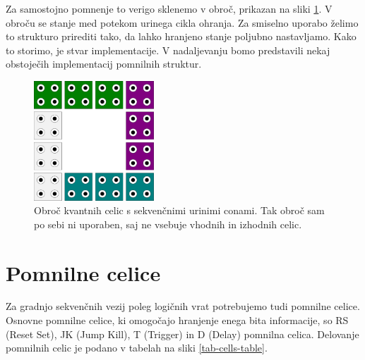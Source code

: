 \documentclass[a4paper, 11pt]{article}
\begin{document}
Za samostojno pomnenje to verigo sklenemo v obroč, prikazan na sliki \ref{img-pregled-seq-circ}.
V obroču se stanje med potekom urinega cikla ohranja.
Za smiselno uporabo želimo to strukturo prirediti tako, da lahko hranjeno stanje poljubno nastavljamo.
Kako to storimo, je stvar implementacije.
V nadaljevanju bomo predstavili nekaj obstoječih implementacij pomnilnih struktur.

\begin{figure}[h]
	\centering
	\includegraphics[width=0.40\textwidth]{../img/pregled/seq_circ.pdf}
	\caption{Obroč kvantnih celic s sekvenčnimi urinimi conami. Tak obroč sam po sebi ni uporaben, saj ne vsebuje vhodnih in izhodnih celic.}
	\label{img-pregled-seq-circ}
\end{figure}



\section{Pomnilne celice}

Za gradnjo sekvenčnih vezij poleg logičnih vrat potrebujemo tudi pomnilne celice.
Osnovne pomnilne celice, ki omogočajo hranjenje enega bita informacije, so RS (Reset Set), JK (Jump Kill), T (Trigger) in D (Delay) pomnilna celica.
Delovanje pomnilnih celic je podano v tabelah na sliki \ref{tab-cells-table}.
\end{document}
